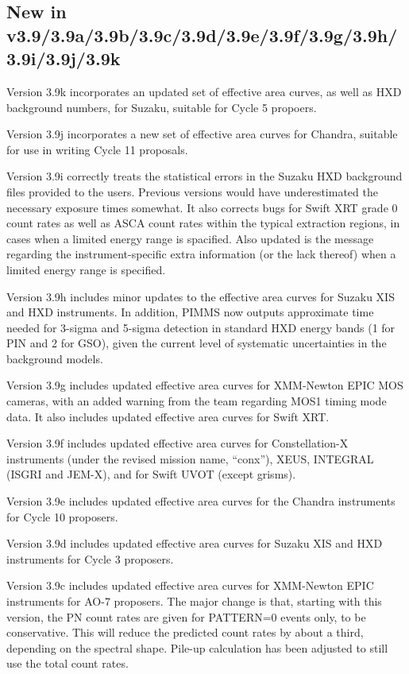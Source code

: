 \subsection{New in v3.9/3.9a/3.9b/3.9c/3.9d/3.9e/3.9f/3.9g/3.9h/3.9i/3.9j/3.9k}

Version 3.9k incorporates an updated set of effective area curves,
as well as HXD background numbers, for Suzaku, suitable for Cycle 5
propoers.

Version 3.9j incorporates a new set of effective area curves for Chandra,
suitable for use in writing Cycle 11 proposals.

Version 3.9i correctly treats the statistical errors in the Suzaku HXD
background files provided to the users.  Previous versions would have
underestimated the necessary exposure times somewhat.  It also corrects
bugs for Swift XRT grade 0 count rates as well as ASCA count rates within
the typical extraction regions, in cases when a limited energy range is
spacified.  Also updated is the message regarding the instrument-specific
extra information (or the lack thereof) when a limited energy range is
specified.

Version 3.9h includes minor updates to the effective area curves for
Suzaku XIS and HXD instruments.  In addition, PIMMS now outputs
approximate time needed for 3-sigma and 5-sigma detection in standard
HXD energy bands (1 for PIN and 2 for GSO), given the current level
of systematic uncertainties in the background models.

Version 3.9g includes updated effective area curves for XMM-Newton EPIC
MOS cameras, with an added warning from the team regarding MOS1 timing
mode data.  It also includes updated effective area curves for Swift
XRT.

Version 3.9f includes updated effective area curves for Constellation-X
instruments (under the revised mission name, ``conx''), XEUS, INTEGRAL
(ISGRI and JEM-X), and for Swift UVOT (except grisms).

Version 3.9e includes updated effective area curves for the
Chandra instruments for Cycle 10 proposers.

Version 3.9d includes updated effective area curves for Suzaku XIS
and HXD instruments for Cycle 3 proposers.

Version 3.9c includes updated effective area curves for XMM-Newton
EPIC instruments for AO-7 proposers.  The major change is that,
starting with this version, the PN count rates are given for
PATTERN=0 events only, to be conservative.  This will reduce the
predicted count rates by about a third, depending on the spectral
shape.  Pile-up calculation has been adjusted to still use the
total count rates.

